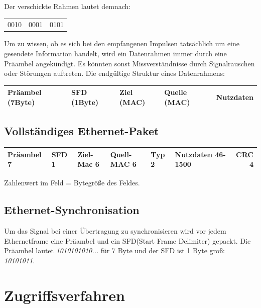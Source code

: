 \documentclass[12pt,a4paper]{article}
\begin{document}
			Der verschickte Rahmen lautet demnach:
			\begin{center}
				\begin{tabularx}{5cm}{XXX}
					0010&0001&0101\\
				\end{tabularx}
			\end{center}
			Um zu wissen, ob es sich bei den empfangenen Impulsen tatsächlich um eine gesendete Information handelt, wird ein Datenrahmen immer durch eine Präambel angekündigt. Es könnten sonst Missverständnisse durch Signalrauschen oder Störungen auftreten. Die endgültige Struktur eines Datenrahmens:
			\begin{center}
				\begin{tabularx}{17cm}{|l|l|X|X|X|}
					\hline
					Präambel (7Byte)&SFD (1Byte)&Ziel (MAC)&Quelle (MAC)&Nutzdaten\\
					\hline
				\end{tabularx}
			\end{center}
		   
		\subsection{Vollständiges Ethernet-Paket}
			\begin{center}
				\renewcommand{\arraystretch}{1.5}
				\begin{tabularx}{17cm}{|l|l|l|X|X|X|r|}
					\hline
					Präambel 7&SFD 1&Ziel-Mac 6&Quell-MAC 6&Typ 2&Nutzdaten 46-1500&CRC 4\\
					\hline
				\end{tabularx}
			\end{center}
			\begin{center}
				Zahlenwert im Feld = Bytegröße des Feldes.
			\end{center}

		\subsection{Ethernet-Synchronisation}
			Um das Signal bei einer Übertragung zu synchronisieren wird vor jedem Ethernetframe eine Präambel und ein SFD(Start Frame Delimiter) gepackt. Die Präambel lautet \textit{1010101010...} für 7 Byte und der SFD ist 1 Byte groß: \textit{10101011}.
		
	\section{Zugriffsverfahren}
\end{document}
